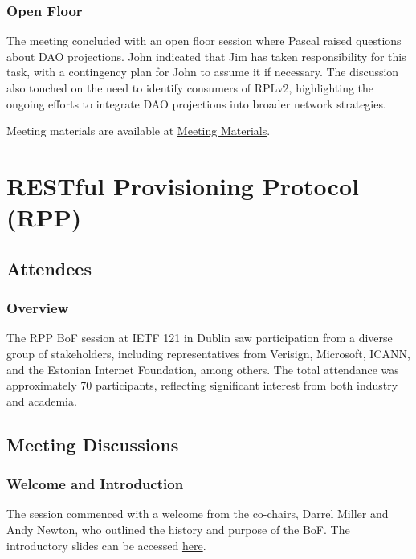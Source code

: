 \documentclass{article}
\begin{document}
\subsubsection{Open Floor}
The meeting concluded with an open floor session where Pascal raised questions about DAO projections. John indicated that Jim has taken responsibility for this task, with a contingency plan for John to assume it if necessary. The discussion also touched on the need to identify consumers of RPLv2, highlighting the ongoing efforts to integrate DAO projections into broader network strategies.

Meeting materials are available at \href{https://example.com/meeting-materials}{Meeting Materials}.




\newpage

\section{RESTful Provisioning Protocol (RPP)}

\subsection{Attendees}
\subsubsection{Overview}
The RPP BoF session at IETF 121 in Dublin saw participation from a diverse group of stakeholders, including representatives from Verisign, Microsoft, ICANN, and the Estonian Internet Foundation, among others. The total attendance was approximately 70 participants, reflecting significant interest from both industry and academia.

\subsection{Meeting Discussions}

\subsubsection{Welcome and Introduction}
The session commenced with a welcome from the co-chairs, Darrel Miller and Andy Newton, who outlined the history and purpose of the BoF. The introductory slides can be accessed \href{https://datatracker.ietf.org/meeting/121/materials/slides-121-rpp-introduction-and-agenda-slides-02}{here}.
\end{document}
